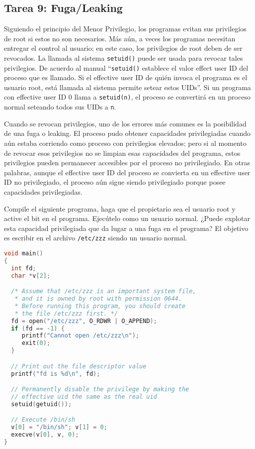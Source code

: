\subsection{Tarea 9: Fuga/Leaking}

Siguiendo el principio del Menor Privilegio, los programas \setuid evitan sus privilegios de root si estos no son necesarios. Más aún, a veces los programas necesitan entregar el control al usuario; en este caso, los privilegios de root deben de ser revocados. 
La llamada al sistema {\tt setuid()}  puede ser usada para revocar tales privilegios. 
De acuerdo al manual ``\texttt{setuid()} establece el valor effect user ID del proceso que es llamado. Si el effective user ID de quién invoca el programa es el usuario root, está llamada al sistema permite setear estos UIDs''.
Si un programa \setuid con effective user ID 0 llama a \texttt{setuid(n)}, el proceso se convertirá en un proceso normal seteando todos sus UIDs a \texttt{n}.

Cuando se revocan privilegios, uno de los errores más comunes es la posibilidad de una fuga o leaking. El proceso pudo obtener capacidades privilegiadas cuando aún estaba corriendo como proceso con privilegios elevados; pero si al momento de revocar esos privilegios no se limpian esas capacidades del programa, estos privilegios pueden permanecer accesibles por el proceso no privilegiado. En otras palabras, aunque el effective user ID del proceso se convierta en un effective user ID no privilegiado, el proceso aún sigue siendo privilegiado porque posee capacidades privilegiadas.

Compile el siguiente programa, haga que el propietario sea el usuario root y active el bit \setuid en el programa. Ejecútelo como un usuario normal.
¿Puede explotar esta capacidad privilegiada que da lugar a una fuga en el programa?
El objetivo es escribir en el archivo {\tt /etc/zzz} siendo un usuario normal.

\begin{lstlisting}[language=C, caption=\texttt{cap\_leak.c}]
void main()
{
  int fd;
  char *v[2];

  /* Assume that /etc/zzz is an important system file,
   * and it is owned by root with permission 0644.
   * Before running this program, you should create
   * the file /etc/zzz first. */
  fd = open("/etc/zzz", O_RDWR | O_APPEND);
  if (fd == -1) {
     printf("Cannot open /etc/zzz\n");
     exit(0);
  }

  // Print out the file descriptor value
  printf("fd is %d\n", fd);

  // Permanently disable the privilege by making the
  // effective uid the same as the real uid
  setuid(getuid());

  // Execute /bin/sh
  v[0] = "/bin/sh"; v[1] = 0;
  execve(v[0], v, 0);
}
\end{lstlisting}



